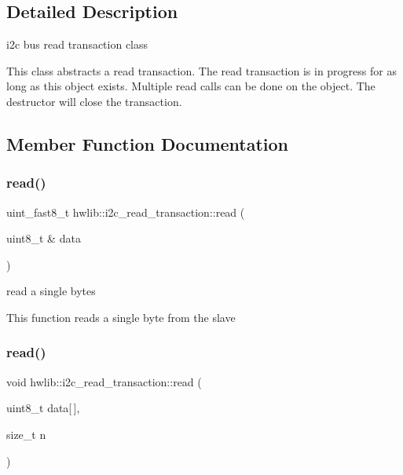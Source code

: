 \subsection{Detailed Description}
i2c bus read transaction class

This class abstracts a read transaction. The read transaction is in progress for as long as this object exists. Multiple read calls can be done on the object. The destructor will close the transaction. 

\subsection{Member Function Documentation}
\mbox{\label{classhwlib_1_1i2c__read__transaction_a624e7979dcf697e748955bace4cf2273}} 
\subsubsection{\texorpdfstring{read()}{read()}\hspace{0.1cm}{\footnotesize\ttfamily [1/2]}}
{\footnotesize\ttfamily uint\+\_\+fast8\+\_\+t hwlib\+::i2c\+\_\+read\+\_\+transaction\+::read (\begin{DoxyParamCaption}\item[{uint8\+\_\+t \&}]{data }\end{DoxyParamCaption})\hspace{0.3cm}{\ttfamily [inline]}}

read a single bytes

This function reads a single byte from the slave \mbox{\label{classhwlib_1_1i2c__read__transaction_a4c886112d92dddb502cb18a18c3a385f}} 
\subsubsection{\texorpdfstring{read()}{read()}\hspace{0.1cm}{\footnotesize\ttfamily [2/2]}}
{\footnotesize\ttfamily void hwlib\+::i2c\+\_\+read\+\_\+transaction\+::read (\begin{DoxyParamCaption}\item[{uint8\+\_\+t}]{data\mbox{[}$\,$\mbox{]},  }\item[{size\+\_\+t}]{n }\end{DoxyParamCaption})\hspace{0.3cm}{\ttfamily [inline]}}


